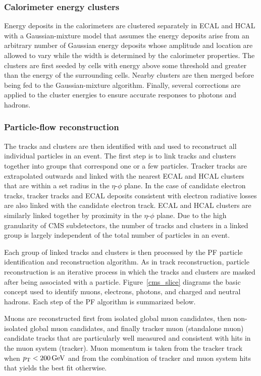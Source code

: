 \subsubsection{Calorimeter energy clusters}
Energy deposits in the calorimeters are clustered separately in ECAL and HCAL with a Gaussian-mixture model that assumes the energy deposits arise from an arbitrary number of Gaussian energy deposits whose amplitude and location are allowed to vary while the width is determined by the calorimeter properties. The clusters are first seeded by cells with energy above some threshold and greater than the energy of the surrounding cells. Nearby clusters are then merged before being fed to the Gaussian-mixture algorithm. Finally, several corrections are applied to the cluster energies to ensure accurate responses to photons and hadrons.

\subsubsection{Particle-flow reconstruction}
The tracks and clusters are then identified with and used to reconstruct all individual particles in an event. The first step is to link tracks and clusters together into groups that correspond one or a few particles. Tracker tracks are extrapolated outwards and linked with the nearest ECAL and HCAL clusters that are within a set radius in the $\eta$-$\phi$ plane. In the case of candidate electron tracks, tracker tracks and ECAL deposits consistent with electron radiative losses are also linked with the candidate electron track. ECAL and HCAL clusters are similarly linked together by proximity in the $\eta$-$\phi$ plane. Due to the high granularity of CMS subdetectors, the number of tracks and clusters in a linked group is largely independent of the total number of particles in an event.

Each group of linked tracks and clusters is then processed by the PF particle identification and reconstruction algorithm. As in track reconstruction, particle reconstruction is an iterative process in which the tracks and clusters are masked after being associated with a particle. Figure~\ref{cms_slice} diagrams the basic concept used to identify muons, electrons, photons, and charged and neutral hadrons. Each step of the PF algorithm is summarized below.

Muons are reconstructed first from isolated global muon candidates, then non-isolated global muon candidates, and finally tracker muon (standalone muon) candidate tracks that are particularly well measured and consistent with hits in the muon system (tracker). Muon momentum is taken from the tracker track when $\pt<\SI{200}{\GeV}$ and from the combination of tracker and muon system hits that yields the best fit otherwise.

